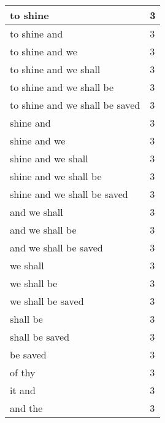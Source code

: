\begin{center}
\begin{longtable}{|p{3.0in}|p{0.5in}|}
to shine & 3\\ \hline 
to shine and & 3\\ \hline 
to shine and we & 3\\ \hline 
to shine and we shall & 3\\ \hline 
to shine and we shall be & 3\\ \hline 
to shine and we shall be saved & 3\\ \hline 
shine and & 3\\ \hline 
shine and we & 3\\ \hline 
shine and we shall & 3\\ \hline 
shine and we shall be & 3\\ \hline 
shine and we shall be saved & 3\\ \hline 
and we shall & 3\\ \hline 
and we shall be & 3\\ \hline 
and we shall be saved & 3\\ \hline 
we shall & 3\\ \hline 
we shall be & 3\\ \hline 
we shall be saved & 3\\ \hline 
shall be & 3\\ \hline 
shall be saved & 3\\ \hline 
be saved & 3\\ \hline 
of thy & 3\\ \hline 
it and & 3\\ \hline 
and the & 3\\ \hline 
\end{longtable}
\end{center}





